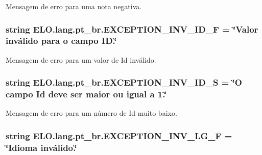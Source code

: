 Mensagem de erro para uma nota negativa. 

\hypertarget{namespaceELO_1_1lang_1_1pt__br_af03bc5adf0c3f43ec2a53fedb3a4f6dd}{
\subsubsection[{E\-X\-C\-E\-P\-T\-I\-O\-N\-\_\-\-I\-N\-V\-\_\-\-I\-D\-\_\-\-F}]{\setlength{\rightskip}{0pt plus 5cm}string E\-L\-O.\-lang.\-pt\-\_\-br.\-E\-X\-C\-E\-P\-T\-I\-O\-N\-\_\-\-I\-N\-V\-\_\-\-I\-D\-\_\-\-F = \char`\"{}Valor inválido para o campo I\-D.\char`\"{}}}\label{d5/d70/namespaceELO_1_1lang_1_1pt__br_af03bc5adf0c3f43ec2a53fedb3a4f6dd}


Mensagem de erro para um valor de Id inválido. 

\hypertarget{namespaceELO_1_1lang_1_1pt__br_ac15a5de4e4d5b7e566f530b8819137de}{
\subsubsection[{E\-X\-C\-E\-P\-T\-I\-O\-N\-\_\-\-I\-N\-V\-\_\-\-I\-D\-\_\-\-S}]{\setlength{\rightskip}{0pt plus 5cm}string E\-L\-O.\-lang.\-pt\-\_\-br.\-E\-X\-C\-E\-P\-T\-I\-O\-N\-\_\-\-I\-N\-V\-\_\-\-I\-D\-\_\-\-S = \char`\"{}O campo Id deve ser maior ou igual a 1.\char`\"{}}}\label{d5/d70/namespaceELO_1_1lang_1_1pt__br_ac15a5de4e4d5b7e566f530b8819137de}


Mensagem de erro para um número de Id muito baixo. 

\hypertarget{namespaceELO_1_1lang_1_1pt__br_a6c600c16de98b175e02239d96ba494c6}{
\subsubsection[{E\-X\-C\-E\-P\-T\-I\-O\-N\-\_\-\-I\-N\-V\-\_\-\-L\-G\-\_\-\-F}]{\setlength{\rightskip}{0pt plus 5cm}string E\-L\-O.\-lang.\-pt\-\_\-br.\-E\-X\-C\-E\-P\-T\-I\-O\-N\-\_\-\-I\-N\-V\-\_\-\-L\-G\-\_\-\-F = \char`\"{}Idioma inválido.\char`\"{}}}\label{d5/d70/namespaceELO_1_1lang_1_1pt__br_a6c600c16de98b175e02239d96ba494c6}


